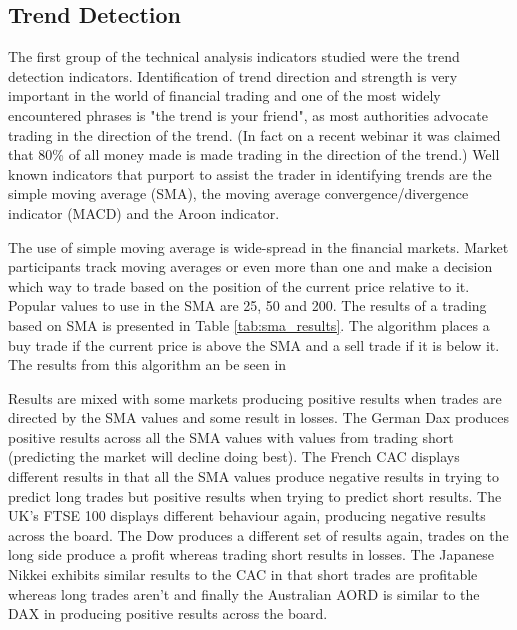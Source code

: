 \subsection{Trend Detection}
The first group of the technical analysis indicators studied were the trend detection indicators. Identification of trend direction and strength is very important in the world of financial trading and one of the most widely encountered phrases is "the trend is your friend", as most authorities advocate trading in the direction of the trend. (In fact on a recent webinar it was claimed that 80\% of all money made is made trading in the direction of the trend.)  Well known indicators that purport to assist the trader in identifying trends are the simple moving average (SMA), the moving average convergence/divergence indicator (MACD) and the Aroon indicator.

The use of simple moving average is wide-spread in the financial markets. Market participants track moving averages or even more than one and make a decision which way to trade based on the position of the current price relative to it. Popular values to use in the SMA are 25, 50 and 200. The results of a trading based on SMA is presented in Table \ref{tab:sma_results}. The algorithm places a buy trade if the current price is above the SMA and a sell trade if it is below it. The results from this algorithm an be seen in 

Results are mixed with some markets producing positive results when trades are directed by the SMA values and some result in losses. The German Dax produces positive results across all the SMA values with values from trading short (predicting the market will decline doing best).  The French CAC displays different results in that all the SMA values produce negative results in trying to  predict long trades but positive results when trying to predict short results.  The UK's FTSE 100 displays different behaviour again, producing negative results across the board. The Dow produces a different set of results again, trades on the long side produce a profit whereas trading short results in losses.  The Japanese Nikkei exhibits similar results to the CAC in that short trades are profitable whereas long trades aren't and finally the Australian AORD is similar to the DAX in producing positive results across the board. 


